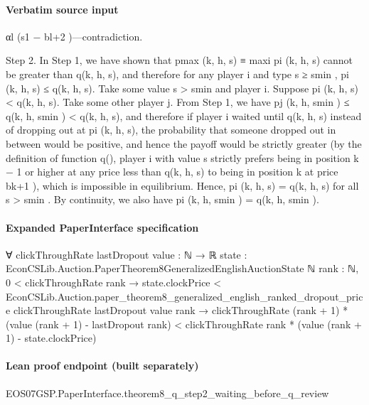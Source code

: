 \documentclass[10pt]{article}
\begin{document}
\paragraph{Verbatim source input}
\begin{ReviewVerbatim}
αl (s1 − bl+2 )—contradiction.

Step 2. In Step 1, we have shown that pmax (k, h, s) ≡ maxi pi (k, h, s) cannot be greater than
q(k, h, s), and therefore for any player i and type s ≥ smin , pi (k, h, s) ≤ q(k, h, s). Take some value
s > smin and player i. Suppose pi (k, h, s) < q(k, h, s). Take some other player j. From Step 1,
we have pj (k, h, smin ) ≤ q(k, h, smin ) < q(k, h, s), and therefore if player i waited until q(k, h, s)
instead of dropping out at pi (k, h, s), the probability that someone dropped out in between would
be positive, and hence the payoff would be strictly greater (by the definition of function q(), player
i with value s strictly prefers being in position k − 1 or higher at any price less than q(k, h, s) to
being in position k at price bk+1 ), which is impossible in equilibrium. Hence, pi (k, h, s) = q(k, h, s)
for all s > smin . By continuity, we also have pi (k, h, smin ) = q(k, h, smin ).
\end{ReviewVerbatim}


\paragraph{Expanded PaperInterface specification}
\begin{ReviewVerbatim}
∀ {clickThroughRate lastDropout value : ℕ → ℝ} {state : EconCSLib.Auction.PaperTheorem8GeneralizedEnglishAuctionState ℕ}
  {rank : ℕ},
  0 < clickThroughRate rank →
    state.clockPrice <
        EconCSLib.Auction.paper_theorem8_generalized_english_ranked_dropout_price clickThroughRate lastDropout value
          rank →
      clickThroughRate (rank + 1) * (value (rank + 1) - lastDropout rank) <
        clickThroughRate rank * (value (rank + 1) - state.clockPrice)
\end{ReviewVerbatim}

\paragraph{Lean proof endpoint (built separately)}\begin{ReviewVerbatim}
EOS07GSP.PaperInterface.theorem8_q_step2_waiting_before_q_review
\end{ReviewVerbatim}
\end{document}
